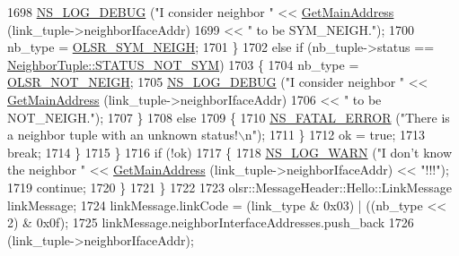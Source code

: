 \begin{DoxyCode}
1698                       \hyperlink{group__logging_ga413f1886406d49f59a6a0a89b77b4d0a}{NS\_LOG\_DEBUG} (\textcolor{stringliteral}{"I consider neighbor "} << 
      \hyperlink{classns3_1_1olsr_1_1RoutingProtocol_ae01451170fb389d322b33ed6d954f460}{GetMainAddress} (link\_tuple->neighborIfaceAddr)
1699                                                            << \textcolor{stringliteral}{" to be SYM\_NEIGH."});
1700                       nb\_type = \hyperlink{olsr-routing-protocol_8cc_a46286c316da9922151b354295e71d35a}{OLSR\_SYM\_NEIGH};
1701                     \}
1702                   \textcolor{keywordflow}{else} \textcolor{keywordflow}{if} (nb\_tuple->status == \hyperlink{structns3_1_1olsr_1_1NeighborTuple_ad4b623edaedb3a5244291c738ce87e12ab633cfd28c2ec5d1f2b6deec3c7ebcf9}{NeighborTuple::STATUS\_NOT\_SYM})
1703                     \{
1704                       nb\_type = \hyperlink{olsr-routing-protocol_8cc_a7ff690f7463019aec83c1f0edd911034}{OLSR\_NOT\_NEIGH};
1705                       \hyperlink{group__logging_ga413f1886406d49f59a6a0a89b77b4d0a}{NS\_LOG\_DEBUG} (\textcolor{stringliteral}{"I consider neighbor "} << 
      \hyperlink{classns3_1_1olsr_1_1RoutingProtocol_ae01451170fb389d322b33ed6d954f460}{GetMainAddress} (link\_tuple->neighborIfaceAddr)
1706                                                            << \textcolor{stringliteral}{" to be NOT\_NEIGH."});
1707                     \}
1708                   \textcolor{keywordflow}{else}
1709                     \{
1710                       \hyperlink{group__fatal_ga5131d5e3f75d7d4cbfd706ac456fdc85}{NS\_FATAL\_ERROR} (\textcolor{stringliteral}{"There is a neighbor tuple with an unknown status!\(\backslash\)n"});
1711                     \}
1712                   ok = \textcolor{keyword}{true};
1713                   \textcolor{keywordflow}{break};
1714                 \}
1715             \}
1716           \textcolor{keywordflow}{if} (!ok)
1717             \{
1718               \hyperlink{group__logging_gade7208b4009cdf0e25783cd26766f559}{NS\_LOG\_WARN} (\textcolor{stringliteral}{"I don't know the neighbor "} << 
      \hyperlink{classns3_1_1olsr_1_1RoutingProtocol_ae01451170fb389d322b33ed6d954f460}{GetMainAddress} (link\_tuple->neighborIfaceAddr) << \textcolor{stringliteral}{"!!!"});
1719               \textcolor{keywordflow}{continue};
1720             \}
1721         \}
1722 
1723       olsr::MessageHeader::Hello::LinkMessage linkMessage;
1724       linkMessage.linkCode = (link\_type & 0x03) | ((nb\_type << 2) & 0x0f);
1725       linkMessage.neighborInterfaceAddresses.push\_back
1726         (link\_tuple->neighborIfaceAddr);

\end{DoxyCode}
